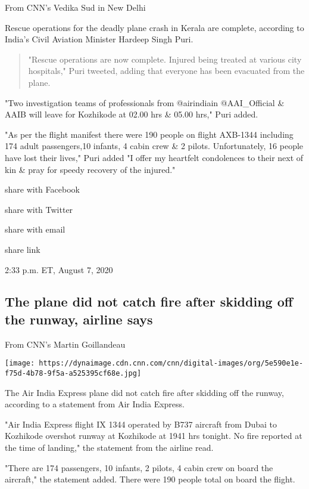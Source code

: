 From CNN's Vedika Sud in New Delhi~

Rescue operations for the deadly plane crash in Kerala are complete,
according to India's Civil Aviation Minister Hardeep Singh Puri.

\begin{quote}
"Rescue operations are now complete. Injured being treated at various
city hospitals," Puri tweeted, adding that everyone has been evacuated
from the plane.
\end{quote}

"Two investigation teams of professionals from @airindiain
@AAI\_Official \& AAIB will leave for Kozhikode at 02.00 hrs \& 05.00
hrs," Puri added.

"As per the flight manifest there were 190 people on flight AXB-1344
including 174 adult passengers,10 infants, 4 cabin crew \& 2 pilots.
Unfortunately, 16 people have lost their lives," Puri added "I offer my
heartfelt condolences to their next of kin \& pray for speedy recovery
of the injured."

share with Facebook

share with Twitter

share with email

share link

2:33 p.m. ET, August 7, 2020

\hypertarget{the-plane-did-not-catch-fire-after-skidding-off-the-runway-airline-says}{%
\subsection{The plane did not catch fire after skidding off the runway,
airline
says}\label{the-plane-did-not-catch-fire-after-skidding-off-the-runway-airline-says}}

From CNN's Martin Goillandeau

\texttt{[image: https://dynaimage.cdn.cnn.com/cnn/digital-images/org/5e590e1e-f75d-4b78-9f5a-a525395cf68e.jpg]}

The Air India Express plane did not catch fire after skidding off the
runway, according to a statement from Air India Express.

"Air India Express flight IX 1344 operated by B737 aircraft from Dubai
to Kozhikode overshot runway at Kozhikode at 1941 hrs tonight. No fire
reported at the time of landing," the statement from the airline read.

"There are 174 passengers, 10 infants, 2 pilots, 4 cabin crew on board
the aircraft," the statement added. There were 190 people total on board
the flight.

